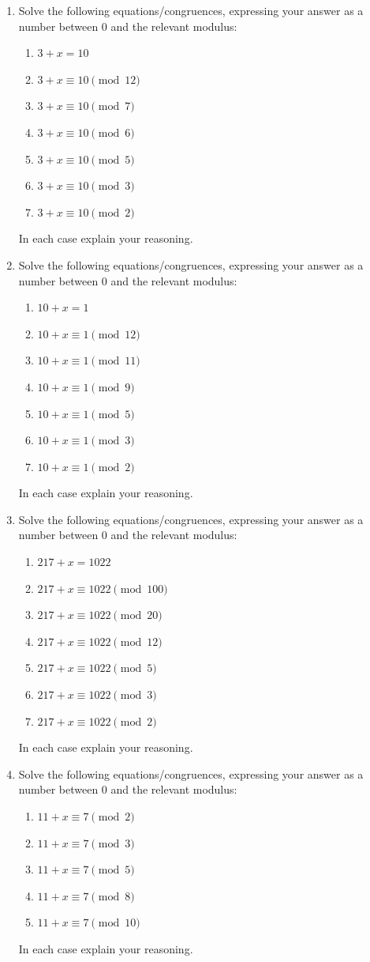 \begin{problems}
\begin{enumerate}
\item Solve the following equations/congruences, expressing your
  answer as a number between $0$ and the relevant modulus:
\begin{enumerate}
\item $3 + x = 10$
\item $3 + x \equiv 10 \pmod{12}$
\item $3 + x \equiv 10 \pmod{7}$
\item $3 + x \equiv 10 \pmod{6}$
\item $3 + x \equiv 10 \pmod{5}$
\item $3 + x \equiv 10 \pmod{3}$
\item $3 + x \equiv 10 \pmod{2}$
\end{enumerate}
In each case explain your reasoning.
\item Solve the following equations/congruences, expressing your
  answer as a number between $0$ and the relevant modulus:
\begin{enumerate}
\item $10 + x = 1$
\item $10 + x \equiv 1 \pmod{12}$
\item $10 + x \equiv 1 \pmod{11}$
\item $10 + x \equiv 1 \pmod{9}$
\item $10 + x \equiv 1 \pmod{5}$
\item $10 + x \equiv 1 \pmod{3}$
\item $10 + x \equiv 1 \pmod{2}$
\end{enumerate}
In each case explain your reasoning.
\item Solve the following equations/congruences, expressing your
  answer as a number between $0$ and the relevant modulus:
\begin{enumerate}
\item $217 + x = 1022$
\item $217 + x \equiv 1022 \pmod{100}$
\item $217 + x \equiv 1022 \pmod{20}$
\item $217 + x \equiv 1022 \pmod{12}$
\item $217 + x \equiv 1022 \pmod{5}$
\item $217 + x \equiv 1022 \pmod{3}$
\item $217 + x \equiv 1022 \pmod{2}$
\end{enumerate}
In each case explain your reasoning.
\item Solve the following equations/congruences, expressing your
  answer as a number between $0$ and the relevant modulus:
\begin{enumerate}
\item $11+x \equiv 7 \pmod{2}$
\item $11+x \equiv 7 \pmod{3}$
\item $11+x \equiv 7 \pmod{5}$
\item $11+x \equiv 7 \pmod{8}$
\item $11+x \equiv 7 \pmod{10}$
\end{enumerate}
In each case explain your reasoning.


\end{enumerate}
\end{problems}
